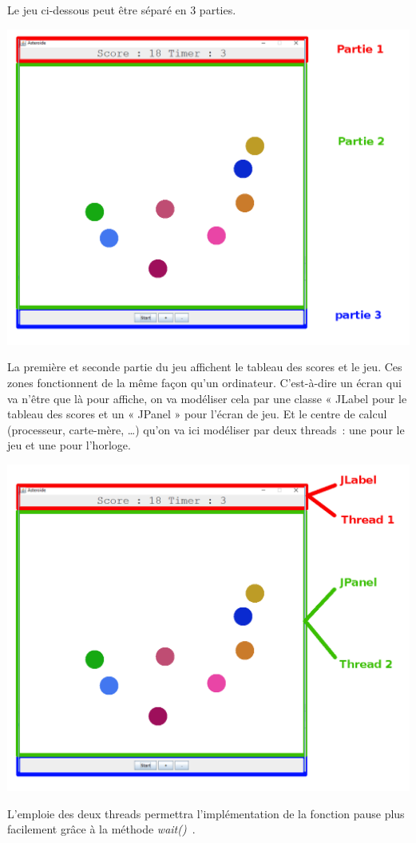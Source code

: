 \documentclass{article}
\begin{document}
Le jeu ci-dessous peut être séparé en 3 parties.
\begin{center}
  \includegraphics[scale=0.30]{ecranjeu.png}
\end{center}
La première et seconde partie du jeu affichent le tableau des scores et le jeu. Ces zones fonctionnent de la même façon qu’un ordinateur. C'est-à-dire un écran qui va n'être que là pour affiche, on va modéliser cela par une classe « JLabel pour le tableau des scores et un « JPanel » pour l’écran de jeu. Et le centre de calcul (processeur, carte-mère, …) qu’on va ici modéliser par deux threads : une pour le jeu et une pour l’horloge.
\begin{center}
  \includegraphics[scale=0.30]{ecranjeu2.png}
\end{center}
L’emploie des deux threads permettra l’implémentation de la fonction pause plus facilement grâce à la méthode \textit{wait()}~\cite{waitDoc}.
\end{document}
